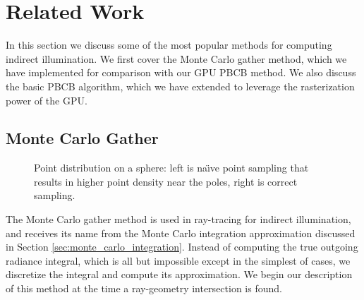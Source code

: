 \chapter{Related Work}

In this section we discuss some of the most popular methods for computing indirect illumination. We first cover the Monte Carlo gather method, which we have implemented for comparison with our GPU PBCB method. We also discuss the basic PBCB algorithm, which we have extended to leverage the rasterization power of the GPU.

\section{Monte Carlo Gather}
\label{sec:monte_carlo_gather}

\begin{figure}
    \centering
    \caption[Sphere Point Distribution]{Point distribution on a sphere: left is na\"{\i}ve point sampling that results in higher point density near the poles, right is correct sampling. \cite{bib:point_sampling_wa}}
    \label{fig:sphere_sampling}
\end{figure}

The Monte Carlo gather method is used in ray-tracing for indirect illumination, and receives its name from the Monte Carlo integration approximation discussed in Section \ref{sec:monte_carlo_integration}. Instead of computing the true outgoing radiance integral, which is all but impossible except in the simplest of cases, we discretize the integral and compute its approximation. We begin our description of this method at the time a ray-geometry intersection is found.

